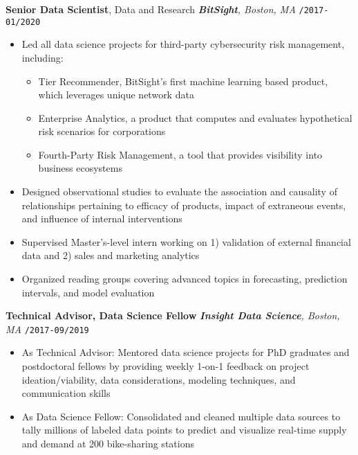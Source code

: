 \documentclass[10pt,english]{report}
\begin{document}
\vspace{1mm}

\textbf{Senior Data Scientist}, Data and Research \hfill \textit{\textbf{BitSight}, Boston, MA} \texttt{/2017-01/2020}
\begin{itemize}
		\item Led all data science projects for third-party cybersecurity risk management, including:
		\begin{itemize}
				\item Tier Recommender, BitSight's first machine learning based product, which leverages unique network data
				\item Enterprise Analytics, a product that computes and evaluates hypothetical risk scenarios for corporations
				\item Fourth-Party Risk Management, a tool that provides visibility into business ecosystems
		\end{itemize}
    \item Designed observational studies to evaluate the association and causality of relationships pertaining to efficacy of products, impact of extraneous events, and influence of internal interventions
		\item Supervised Master's-level intern working on 1) validation of external financial data and 2) sales and marketing analytics
		\item Organized reading groups covering advanced topics in forecasting, prediction intervals, and model evaluation
\end{itemize}

\vspace{1mm}

\textbf{Technical Advisor, Data Science Fellow} \hfill \textit{\textbf{Insight Data Science}, Boston, MA} \texttt{/2017-09/2019}
\begin{itemize}
    \item As Technical Advisor: Mentored data science projects for PhD graduates and postdoctoral fellows by providing weekly 1-on-1 feedback on project ideation/viability, data considerations, modeling techniques, and communication skills
    \item As Data Science Fellow: Consolidated and cleaned multiple data sources to tally millions of labeled data points to predict and visualize real-time supply and demand at 200 bike-sharing stations
\end{itemize}
\end{document}

